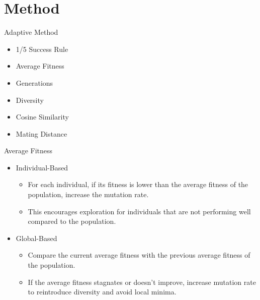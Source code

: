 \section{Method}
    
    \frame{\sectionpage}
    
    \begin{frame}{Adaptive Method}
        \begin{itemize}
            \item 1/5 Success Rule
            \item Average Fitness
            \item Generations
            \item Diversity
            \item Cosine Similarity
            \item Mating Distance
        \end{itemize}
    \end{frame}

    \begin{frame}{Average Fitness}
        \begin{itemize}
            \item Individual-Based
                \begin{itemize}
                    \item For each individual, if its fitness is lower than the average fitness of the population, increase the mutation rate.
                    \item This encourages exploration for individuals that are not performing well compared to the population.
                \end{itemize}
            \item Global-Based
                \begin{itemize}
                    \item Compare the current average fitness with the previous average fitness of the population.
                    \item If the average fitness stagnates or doesn’t improve, increase mutation rate to reintroduce diversity and avoid local minima.
                \end{itemize}
        \end{itemize}
    \end{frame}

